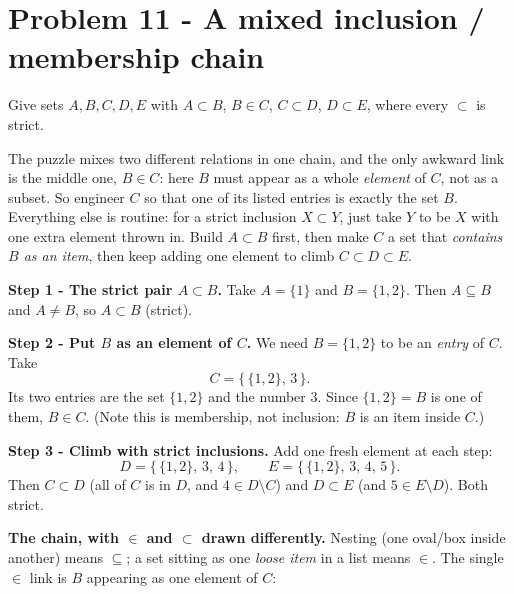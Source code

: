 \documentclass[11pt,a4paper]{article}
\begin{document}
\section*{Problem 11 - A mixed inclusion / membership chain}

\begin{problembox}[11]
Give sets $A,B,C,D,E$ with $A\subset B$, $B\in C$, $C\subset D$, $D\subset E$, where every
$\subset$ is strict.
\end{problembox}

\begin{ideabox}
The puzzle mixes two different relations in one chain, and the only awkward link is the middle
one, $B\in C$: here $B$ must appear as a whole \emph{element} of $C$, not as a subset. So engineer
$C$ so that one of its listed entries is exactly the set $B$. Everything else is routine: for a
strict inclusion $X\subset Y$, just take $Y$ to be $X$ with one extra element thrown in. Build
$A\subset B$ first, then make $C$ a set that \emph{contains $B$ as an item}, then keep adding one
element to climb $C\subset D\subset E$.
\end{ideabox}

\textbf{Step 1 - The strict pair $A\subset B$.}
Take $A=\{1\}$ and $B=\{1,2\}$. Then $A\subseteq B$ and $A\neq B$, so $A\subset B$ (strict). \checkmark

\textbf{Step 2 - Put $B$ as an element of $C$.}
We need $B=\{1,2\}$ to be an \emph{entry} of $C$. Take
$$C=\{\,\{1,2\},\,3\,\}.$$
Its two entries are the set $\{1,2\}$ and the number $3$. Since $\{1,2\}=B$ is one of them,
$B\in C$. \checkmark
(Note this is membership, not inclusion: $B$ is an item inside $C$.)

\textbf{Step 3 - Climb with strict inclusions.}
Add one fresh element at each step:
$$D=\{\,\{1,2\},\,3,\,4\,\},\qquad E=\{\,\{1,2\},\,3,\,4,\,5\,\}.$$
Then $C\subset D$ (all of $C$ is in $D$, and $4\in D\setminus C$) and $D\subset E$ (and
$5\in E\setminus D$). Both strict. \checkmark

\textbf{The chain, with $\in$ and $\subset$ drawn differently.} Nesting (one oval/box inside
another) means $\subseteq$; a set sitting as one \emph{loose item} in a list means $\in$. The
single $\in$ link is $B$ appearing as one element of $C$:
\end{document}
